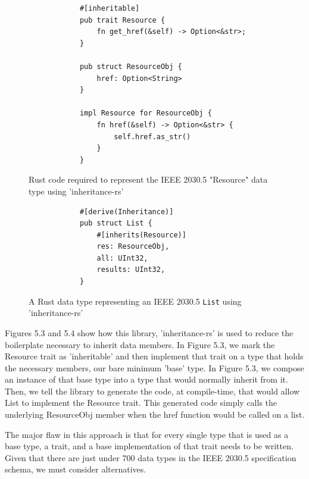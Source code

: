 \begin{figure}[H]
    \begin{center}
        \begin{lstlisting}
            #[inheritable]
            pub trait Resource {
                fn get_href(&self) -> Option<&str>;
            }

            pub struct ResourceObj {
                href: Option<String>
            }

            impl Resource for ResourceObj {
                fn href(&self) -> Option<&str> {
                    self.href.as_str()
                }
            }
        \end{lstlisting}
        \label{fig:resinher}
        \caption{Rust code required to represent the IEEE 2030.5 "Resource" data type using 'inheritance-rs'}
    \end{center}
\end{figure}

\begin{figure}[H]
    \begin{center}
        \begin{lstlisting}
            #[derive(Inheritance)]
            pub struct List {
                #[inherits(Resource)]
                res: ResourceObj,
                all: UInt32,
                results: UInt32,
            }
        \end{lstlisting}
        \label{fig:listinher}
        \caption{A Rust data type representing an IEEE 2030.5 \texttt{List} using 'inheritance-rs'}
    \end{center}
\end{figure}


Figures 5.3 and 5.4 show how this library, 'inheritance-rs' \cite[]{inheritancers} is used to reduce the boilerplate necessary to inherit data members. 
In Figure 5.3, we mark the Resource trait as 'inheritable' and then implement that trait on a type that holds the necessary members, our bare minimum 'base' type. 
In Figure 5.3, we compose an instance of that base type into a type that would normally inherit from it. Then, we tell the library to generate the code, at compile-time, that would allow List to implement the Resource trait.
This generated code simply calls the underlying ResourceObj member when the href function would be called on a list.

The major flaw in this approach is that for every single type that is used as a base type, a trait, and a base implementation of that trait needs to be written.
Given that there are just under 700 data types in the IEEE 2030.5 specification schema, we must consider alternatives.


